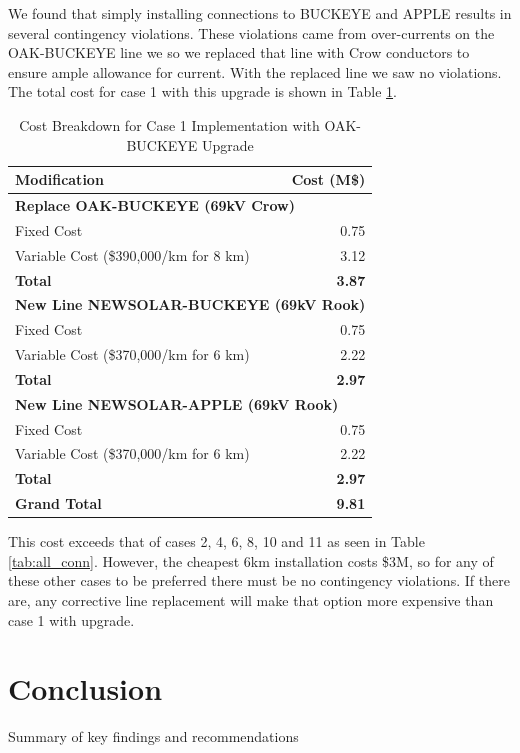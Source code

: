 \documentclass[conference]{IEEEtran}
\begin{document}
We found that simply installing connections to BUCKEYE and APPLE results in several contingency violations. These violations came from over-currents on the OAK-BUCKEYE line we so we replaced that line with Crow conductors to ensure ample allowance for current. With the replaced line we saw no violations. The total cost for case 1 with this upgrade is shown in Table \ref{tab:cost_breakdown_case1}.
\begin{table}[h!]
	\centering
	\begin{tabular}{|l|r|}
		\hline
		\textbf{Modification} & \textbf{Cost (M\$)} \\ \hline
		\multicolumn{2}{|l|}{\textbf{Replace OAK-BUCKEYE (69kV Crow)}} \\ 
		\hspace{1em} Fixed Cost & 0.75 \\ 
		\hspace{1em} Variable Cost (\$390,000/km for 8 km) & 3.12 \\ 
		\hspace{1em} \textbf{Total} & \textbf{3.87} \\ \hline
		\multicolumn{2}{|l|}{\textbf{New Line NEWSOLAR-BUCKEYE (69kV Rook)}} \\ 
		\hspace{1em} Fixed Cost & 0.75 \\ 
		\hspace{1em} Variable Cost (\$370,000/km for 6 km) & 2.22 \\ 
		\hspace{1em} \textbf{Total} & \textbf{2.97} \\ \hline
		\multicolumn{2}{|l|}{\textbf{New Line NEWSOLAR-APPLE (69kV Rook)}} \\ 
		\hspace{1em} Fixed Cost & 0.75 \\ 
		\hspace{1em} Variable Cost (\$370,000/km for 6 km) & 2.22 \\ 
		\hspace{1em} \textbf{Total} & \textbf{2.97} \\ \hline
		\textbf{Grand Total} & \textbf{9.81} \\ \hline
	\end{tabular}
	\vspace{0.5em}
	\caption{Cost Breakdown for Case 1 Implementation with OAK-BUCKEYE Upgrade}
	\label{tab:cost_breakdown_case1}
\end{table}

This cost exceeds that of cases 2, 4, 6, 8, 10 and 11 as seen in Table \ref{tab:all_conn}. However, the cheapest 6km installation costs \$3M, so for any of these other cases to be preferred there must be no contingency violations. If there are, any corrective line replacement will make that option more expensive than case 1 with upgrade.


\section{Conclusion}
Summary of key findings and recommendations
\end{document}
